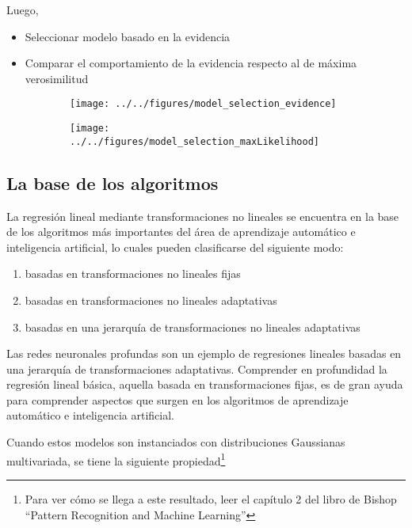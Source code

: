\documentclass[a4paper,10pt]{article}
\begin{document}
Luego,

\begin{itemize}
 \item Seleccionar modelo basado en la evidencia
 \item Comparar el comportamiento de la evidencia respecto al de m\'axima verosimilitud
\end{itemize}

\begin{figure}[H]     
     \centering 
     \begin{subfigure}[b]{0.47\textwidth}
       \texttt{[image: ../../figures/model\_selection\_evidence]}
     \end{subfigure}
     \begin{subfigure}[b]{0.49\textwidth}
       \texttt{[image: ../../figures/model\_selection\_maxLikelihood]}
     \end{subfigure}
\end{figure}


\subsection{La base de los algoritmos}\label{ssec:gaussiana}

La regresi\'on lineal mediante transformaciones no lineales se encuentra en la base de los algoritmos m\'as importantes del \'area de aprendizaje autom\'atico e inteligencia artificial, lo cuales pueden clasificarse del siguiente modo:
\begin{enumerate}
 \setlength\itemsep{-1mm}
 \item basadas en transformaciones no lineales fijas
 \item basadas en transformaciones no lineales adaptativas
 \item basadas en una jerarqu\'ia de transformaciones no lineales adaptativas
\end{enumerate}

Las redes neuronales profundas son un ejemplo de regresiones lineales basadas en una jerarqu\'ia de transformaciones adaptativas.
Comprender en profundidad la regresi\'on lineal b\'asica, aquella basada en transformaciones fijas, es de gran ayuda para comprender aspectos que surgen en los algoritmos de aprendizaje autom\'atico e inteligencia artificial.

\vspace{0.3cm}

Cuando estos modelos son instanciados con distribuciones Gaussianas multivariada, se tiene la siguiente propiedad\footnote{Para ver c\'omo se llega a este resultado, leer el cap\'itulo 2 del libro de Bishop ``Pattern Recognition and Machine Learning''}
 
\end{document}
